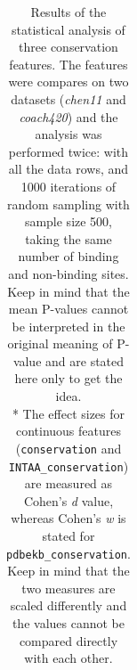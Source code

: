 \begin{table}[]
{\begin{tabular}{llccc}
\end{tabular}
}
\caption[Results of the statistical analysis of three conservation features.]{
Results of the statistical analysis of three conservation features. The features were compares on two datasets (\textit{chen11} and \textit{coach420}) and the analysis was performed twice: with all the data rows, and 1000 iterations of random sampling with sample size 500, taking the same number of binding and non-binding sites. Keep in mind that the mean P-values cannot be interpreted in the original meaning of P-value and are stated here only to get the idea. \\\hspace{\textwidth}
* The effect sizes for continuous features (\texttt{conservation} and \texttt{INTAA\_conservation}) are measured as Cohen's \textit{d} value, whereas Cohen's \textit{w} is stated for \texttt{pdbekb\_conservation}. Keep in mind that the two measures are scaled differently and the values cannot be compared directly with each other.
}
\label{tab:conservation1}
\end{table}

